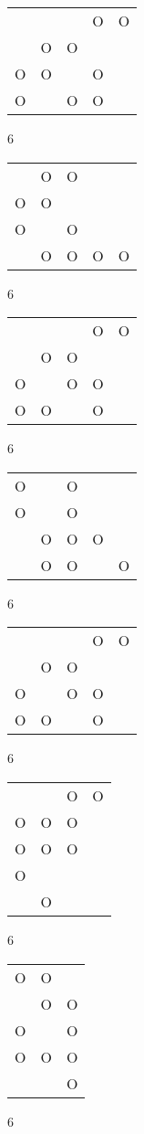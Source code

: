 \begin{tabular}{|m{0.2cm}m{0.2cm}m{0.2cm}m{0.2cm}m{0.2cm}|}\hline
 & & &O&O\\
 &O&O& & \\
O&O& &O& \\
O& &O&O& \\
\hline\end{tabular}6
\begin{tabular}{|m{0.2cm}m{0.2cm}m{0.2cm}m{0.2cm}m{0.2cm}|}\hline
 &O&O& & \\
O&O& & & \\
O& &O& & \\
 &O&O&O&O\\
\hline\end{tabular}6
\begin{tabular}{|m{0.2cm}m{0.2cm}m{0.2cm}m{0.2cm}m{0.2cm}|}\hline
 & & &O&O\\
 &O&O& & \\
O& &O&O& \\
O&O& &O& \\
\hline\end{tabular}6
\begin{tabular}{|m{0.2cm}m{0.2cm}m{0.2cm}m{0.2cm}m{0.2cm}|}\hline
O& &O& & \\
O& &O& & \\
 &O&O&O& \\
 &O&O& &O\\
\hline\end{tabular}6
\begin{tabular}{|m{0.2cm}m{0.2cm}m{0.2cm}m{0.2cm}m{0.2cm}|}\hline
 & & &O&O\\
 &O&O& & \\
O& &O&O& \\
O&O& &O& \\
\hline\end{tabular}6
\begin{tabular}{|m{0.2cm}m{0.2cm}m{0.2cm}m{0.2cm}|}\hline
 & &O&O\\
O&O&O& \\
O&O&O& \\
O& & & \\
 &O& & \\
\hline\end{tabular}6
\begin{tabular}{|m{0.2cm}m{0.2cm}m{0.2cm}|}\hline
O&O& \\
 &O&O\\
O& &O\\
O&O&O\\
 & &O\\
\hline\end{tabular}6
